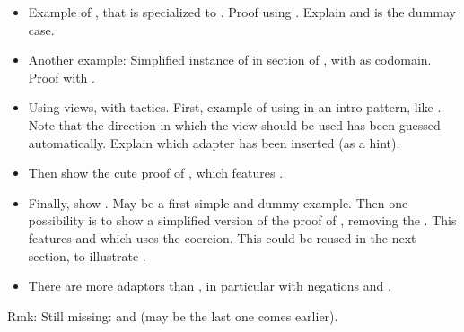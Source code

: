 \begin{itemize}

\item Example of , that is  specialized to
  . Proof using . Explain  and  is
  the dummay case.

\item Another example: Simplified instance of  in
  section   of , with  as
  codomain. Proof with .

\item Using views, with tactics. First, example of using  in
  an intro pattern, like . Note that the direction in
  which the view should be used has been guessed
  automatically. Explain which adapter has been inserted (as a hint).

\item Then show the cute proof of , which features
  .

\item Finally, show . May be a first
  simple and dummy example. Then one possibility is
  to show a simplified version of the proof of , removing
  the . This features 
  and  which uses the  coercion.
  This could be reused in the next section, to illustrate .


\item There are more adaptors than ,
  in particular with negations  and .

\end{itemize}

Rmk: Still missing:  and  (may be the
last one comes earlier).





